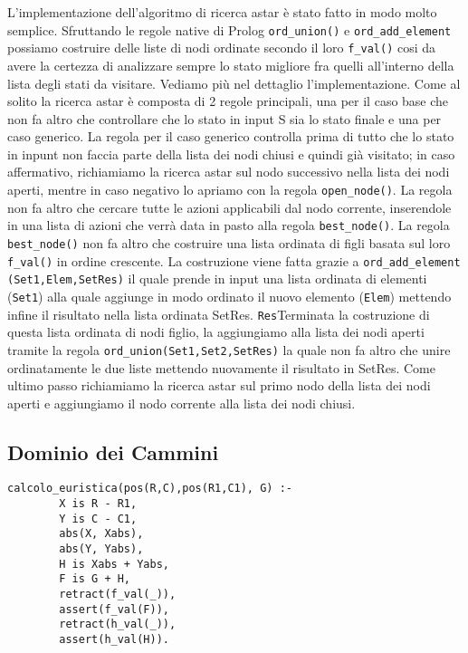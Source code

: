 L'implementazione dell'algoritmo di ricerca astar è stato fatto in modo molto semplice. Sfruttando le regole native di Prolog \lstinline{ord_union()} e \lstinline{ord_add_element} possiamo costruire delle liste di nodi ordinate secondo il loro \lstinline{f_val()} cosi da avere la certezza di analizzare sempre lo stato migliore fra quelli all'interno della lista degli stati da visitare. Vediamo più nel dettaglio l'implementazione. Come al solito la ricerca astar è composta di 2 regole principali, una per il caso base che non fa altro che controllare che lo stato in input S sia lo stato finale e una per caso generico. La regola per il caso generico controlla prima di tutto che lo stato in inpunt non faccia parte della lista dei nodi chiusi e quindi già visitato; in caso affermativo, richiamiamo la ricerca astar sul nodo successivo nella lista dei nodi aperti, mentre in caso negativo lo apriamo con la regola \lstinline{open_node()}. La regola non fa altro che cercare tutte le azioni applicabili dal nodo corrente, inserendole in una lista di azioni che verrà data in pasto alla regola \lstinline{best_node()}. La regola \lstinline{best_node()} non fa altro che costruire una lista ordinata di figli basata sul loro \lstinline{f_val()} in ordine crescente.
La costruzione viene fatta grazie a \lstinline{ord_add_element (Set1,Elem,SetRes)} il quale prende in input una lista ordinata di elementi (\lstinline{Set1}) alla quale aggiunge in modo ordinato il nuovo elemento (\lstinline{Elem}) mettendo infine il risultato nella lista ordinata SetRes. \lstinline{Res}Terminata la costruzione di questa lista ordinata di nodi figlio, la aggiungiamo alla lista dei nodi aperti tramite la regola \lstinline{ord_union(Set1,Set2,SetRes)} la quale non fa altro che unire ordinatamente le due liste mettendo nuovamente il risultato in SetRes.
Come ultimo passo richiamiamo la ricerca astar sul primo nodo della lista dei nodi aperti e aggiungiamo il nodo corrente alla lista dei nodi chiusi.

\subsection{Dominio dei Cammini}

\begin{lstlisting}
calcolo_euristica(pos(R,C),pos(R1,C1), G) :-
        X is R - R1,
        Y is C - C1,
        abs(X, Xabs),
        abs(Y, Yabs),
        H is Xabs + Yabs,
        F is G + H,
        retract(f_val(_)),
        assert(f_val(F)),
        retract(h_val(_)),
        assert(h_val(H)).
\end{lstlisting}

